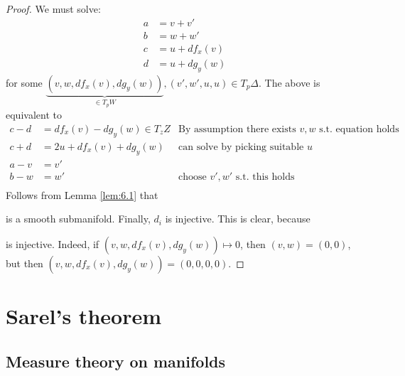 \begin{proof}

    We must solve: 
    \begin{align*}
        a&=v+v'\\
        b&=w+w'\\
        c&=u+df_x(v)\\
        d&=u+dg_y(w)
    \end{align*}
    for some \(\underbrace{(v,w,df_x(v),dg_y(w))}_{\in T_pW}, (v',w',u,u)\in T_p\Delta\).
    The above is equivalent to 
    \begin{align*}
        c-d  & = df_x(v)-dg_y(w)\in T_zZ & \text{By assumption there exists \(v,w\) s.t. equation holds}\\
        c+d &=2u+df_x(v)+dg_y(w) & \text{can solve by picking suitable } u \\
        a-v&=v'&\\
        b-w&=w' & \text{choose } v',w'\text{ s.t. this holds}\\ 
    \end{align*}   %
    Follows from Lemma \ref{lem:6.1} that
    \begin{center}
    \end{center}
    is a smooth submanifold. Finally, \(d_i\) is injective. This is clear, because  is injective. Indeed, if \((v,w,df_x(v),dg_y(w))\mapsto 0\), then \((v,w)=(0,0)\), but then 
    \((v,w,df_x(v),dg_y(w))=(0,0,0,0)\).
\end{proof}

\section{Sarel's theorem} %

\subsection{Measure theory on manifolds}

